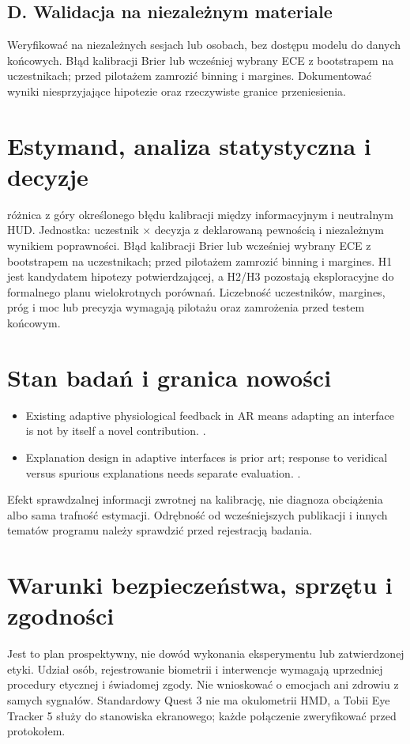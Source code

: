\documentclass[11pt,a4paper]{article}
\begin{document}
\subsection{D. Walidacja na niezależnym materiale}
Weryfikować na niezależnych sesjach lub osobach, bez dostępu modelu do danych końcowych. Błąd kalibracji Brier lub wcześniej wybrany ECE z bootstrapem na uczestnikach; przed pilotażem zamrozić binning i margines. Dokumentować wyniki niesprzyjające hipotezie oraz rzeczywiste granice przeniesienia.
\section{Estymand, analiza statystyczna i decyzje}
różnica z góry określonego błędu kalibracji między informacyjnym i neutralnym HUD. Jednostka: uczestnik × decyzja z deklarowaną pewnością i niezależnym wynikiem poprawności. Błąd kalibracji Brier lub wcześniej wybrany ECE z bootstrapem na uczestnikach; przed pilotażem zamrozić binning i margines. H1 jest kandydatem hipotezy potwierdzającej, a H2/H3 pozostają eksploracyjne do formalnego planu wielokrotnych porównań. Liczebność uczestników, margines, próg i moc lub precyzja wymagają pilotażu oraz zamrożenia przed testem końcowym.
\section{Stan badań i granica nowości}
\begin{itemize}
\item Existing adaptive physiological feedback in AR means adapting an interface is not by itself a novel contribution. \cite{xrprior1}.
\item Explanation design in adaptive interfaces is prior art; response to veridical versus spurious explanations needs separate evaluation. \cite{xrprior2}.
\end{itemize}
Efekt sprawdzalnej informacji zwrotnej na kalibrację, nie diagnoza obciążenia albo sama trafność estymacji. Odrębność od wcześniejszych publikacji i innych tematów programu należy sprawdzić przed rejestracją badania.
\section{Warunki bezpieczeństwa, sprzętu i zgodności}
Jest to plan prospektywny, nie dowód wykonania eksperymentu lub zatwierdzonej etyki. Udział osób, rejestrowanie biometrii i interwencje wymagają uprzedniej procedury etycznej i świadomej zgody. Nie wnioskować o emocjach ani zdrowiu z samych sygnałów. Standardowy Quest 3 nie ma okulometrii HMD, a Tobii Eye Tracker 5 służy do stanowiska ekranowego; każde połączenie zweryfikować przed protokołem.
\end{document}
